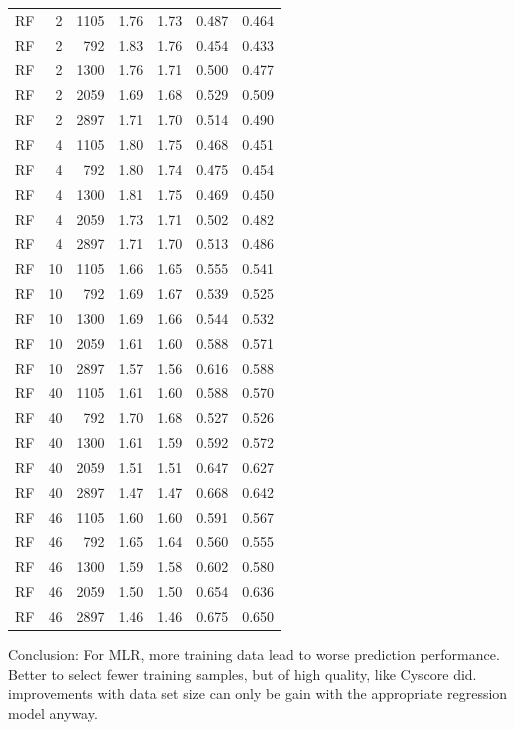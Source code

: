 \documentclass[journal=jacsat,manuscript=article]{achemso}
\begin{document}
\begin{table}
\begin{tabular}{rrrrrrr}
 RF &  2 & 1105 & 1.76 & 1.73 & 0.487 & 0.464\\
 RF &  2 &  792 & 1.83 & 1.76 & 0.454 & 0.433\\
 RF &  2 & 1300 & 1.76 & 1.71 & 0.500 & 0.477\\
 RF &  2 & 2059 & 1.69 & 1.68 & 0.529 & 0.509\\
 RF &  2 & 2897 & 1.71 & 1.70 & 0.514 & 0.490\\
 RF &  4 & 1105 & 1.80 & 1.75 & 0.468 & 0.451\\
 RF &  4 &  792 & 1.80 & 1.74 & 0.475 & 0.454\\
 RF &  4 & 1300 & 1.81 & 1.75 & 0.469 & 0.450\\
 RF &  4 & 2059 & 1.73 & 1.71 & 0.502 & 0.482\\
 RF &  4 & 2897 & 1.71 & 1.70 & 0.513 & 0.486\\
 RF & 10 & 1105 & 1.66 & 1.65 & 0.555 & 0.541\\
 RF & 10 &  792 & 1.69 & 1.67 & 0.539 & 0.525\\
 RF & 10 & 1300 & 1.69 & 1.66 & 0.544 & 0.532\\
 RF & 10 & 2059 & 1.61 & 1.60 & 0.588 & 0.571\\
 RF & 10 & 2897 & 1.57 & 1.56 & 0.616 & 0.588\\
 RF & 40 & 1105 & 1.61 & 1.60 & 0.588 & 0.570\\
 RF & 40 &  792 & 1.70 & 1.68 & 0.527 & 0.526\\
 RF & 40 & 1300 & 1.61 & 1.59 & 0.592 & 0.572\\
 RF & 40 & 2059 & 1.51 & 1.51 & 0.647 & 0.627\\
 RF & 40 & 2897 & 1.47 & 1.47 & 0.668 & 0.642\\
 RF & 46 & 1105 & 1.60 & 1.60 & 0.591 & 0.567\\
 RF & 46 &  792 & 1.65 & 1.64 & 0.560 & 0.555\\
 RF & 46 & 1300 & 1.59 & 1.58 & 0.602 & 0.580\\
 RF & 46 & 2059 & 1.50 & 1.50 & 0.654 & 0.636\\
 RF & 46 & 2897 & 1.46 & 1.46 & 0.675 & 0.650\\
\hline
\end{tabular}
\end{table}

Conclusion: For MLR, more training data lead to worse prediction performance. Better to select fewer training samples, but of high quality, like Cyscore did.
improvements with data set size can only be gain with the appropriate regression model anyway.
\end{document}
